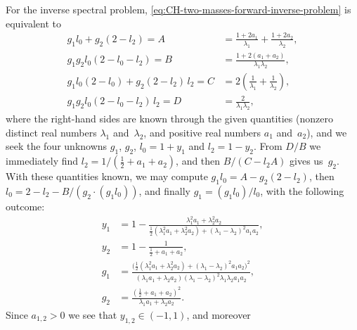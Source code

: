 \documentclass[10pt,a4paper]{article} \pdfoutput=1 
\begin{document}
\begin{example}
  For the inverse spectral problem,
  \eqref{eq:CH-two-masses-forward-inverse-problem} is equivalent to
  \begin{equation}
    \label{eq:CH-two-masses-inverse-problem-naively}
    \begin{aligned}
      g_1 l_0 + g_2 (2-l_2) = A &= \frac{1 + 2 a_1}{\lambda_1} + \frac{1 + 2 a_2}{\lambda_2}
      ,\\
      g_1 g_2 l_0 (2-l_0-l_2) = B & = \frac{1 + 2(a_1+a_2)}{\lambda_1 \lambda_2}
      ,\\
      g_1 l_0 (2-l_0) + g_2 (2-l_2) \, l_2 = C & = 2 \left( \frac{1}{\lambda_1} + \frac{1}{\lambda_2} \right)
      ,\\
      g_1 g_2 l_0 (2 - l_0 - l_2) \, l_2 = D & = \frac{2}{\lambda_1 \lambda_2}
      ,
    \end{aligned}
  \end{equation}
  where the right-hand sides are known through the given quantities
  (nonzero distinct real numbers $\lambda_1$ and~$\lambda_2$,
  and positive real numbers $a_1$ and~$a_2$),
  and we seek the four unknowns $g_1$, $g_2$, $l_0 = 1+y_1$
  and $l_2 = 1-y_2$.
  From $D/B$ we immediately find
  $l_2 = 1/(\tfrac12 + a_1 + a_2)$,
  and then $B / (C - l_2 A)$ gives us~$g_2$.
  With these quantities known, we may compute $g_1 l_0 = A - g_2 (2-l_2)$,
  then $l_0 = 2 - l_2 - B /( g_2 \cdot (g_1 l_0) )$,
  and finally $g_1 = (g_1 l_0) / l_0$,
  with the following outcome:
  \begin{equation}
    \label{eq:CH-two-masses-inverse-problem-solution}
    \begin{aligned}
      y_1 &= 1 - \frac{\lambda_1^2 a_1 + \lambda_2^2 a_2}{ \tfrac12 ( \lambda_1^2 a_1 + \lambda_2^2 a_2 ) + (\lambda_1-\lambda_2)^2 a_1 a_2}
      ,\\
      y_2 &= 1 - \frac{1}{\tfrac12 + a_1 + a_2}
      ,\\
      g_1 &= \frac{ \bigr( \tfrac12 ( \lambda_1^2 a_1 + \lambda_2^2 a_2 ) + (\lambda_1 - \lambda_2)^2 a_1 a_2 \bigr)^2}{(\lambda_1 a_1 + \lambda_2 a_2) (\lambda_1 - \lambda_2)^2 \lambda_1 \lambda_2 a_1 a_2}
      ,\\
      g_2 &= \frac{(\tfrac12 + a_1 + a_2)^2}{\lambda_1 a_1 + \lambda_2 a_2}
      .
    \end{aligned}
  \end{equation}
  Since $a_{1,2} > 0$ we see that $y_{1,2} \in (-1,1)$,
  and moreover
  \begin{equation}
    \label{eq:CH-two-masses-inverse-problem-l1}
    \begin{split}

\end{split}
\end{equation}
\end{example}
\end{document}

